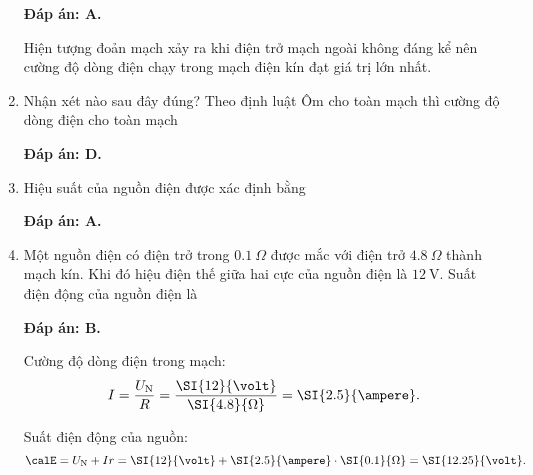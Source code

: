 \begin{enumerate}[label=\bfseries Câu \arabic*:]
	\hideall
	{		\textbf{Đáp án: A.}
		
		Hiện tượng đoản mạch xảy ra khi điện trở mạch ngoài không đáng kể nên cường độ dòng điện chạy trong mạch điện kín đạt giá trị lớn nhất.
		
	}
	\item {}
	
	
	{Nhận xét nào sau đây đúng? Theo định luật Ôm cho toàn mạch thì cường độ dòng điện cho toàn mạch
	}
	
	\hideall
	{		\textbf{Đáp án: D.}
		
		
		
	}
		\item {}
	
	
	{Hiệu suất của nguồn điện được xác định bằng
	}
	
	\hideall
	{		\textbf{Đáp án: A.}
		
		
		
	}
	\item {}
	
	
	{
		Một nguồn điện có điện trở trong $\SI{0.1}{\Omega}$ được mắc với điện trở $\SI{4.8}{\Omega}$ thành mạch kín. Khi đó hiệu điện thế giữa hai cực của nguồn điện là $\SI{12}{\volt}$. Suất điện động của nguồn điện là
	}
	
	\hideall
	{		\textbf{Đáp án: B.}
		
				Cường độ dòng điện trong mạch:
			$$
			I=\dfrac {U_\text N}{R}=\dfrac{\SI{12}{\volt}}{\SI{4.8}{\Omega}} = \SI{2.5}{\ampere}.
			$$
			
			Suất điện động của nguồn:
			$$
			\calE = U_{\text N}+Ir=\SI{12}{\volt} + \SI{2.5}{\ampere} \cdot \SI{0.1}{\Omega} = \SI{12.25}{\volt}.
			$$
		
	}
\end{enumerate}



